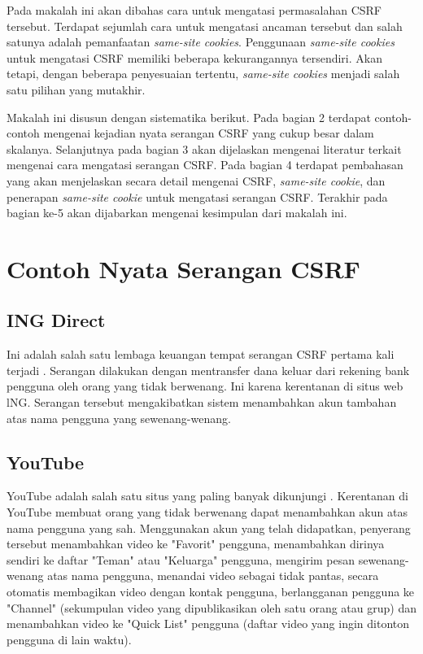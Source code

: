 \documentclass{article}
\begin{document}
Pada makalah ini akan dibahas cara untuk mengatasi permasalahan CSRF tersebut. Terdapat sejumlah cara untuk mengatasi ancaman tersebut dan salah satunya adalah pemanfaatan \textit{same-site cookies}. Penggunaan \textit{same-site cookies} untuk mengatasi CSRF memiliki beberapa kekurangannya tersendiri. Akan tetapi, dengan beberapa penyesuaian tertentu, \textit{same-site cookies} menjadi salah satu pilihan yang mutakhir.

Makalah ini disusun dengan sistematika berikut. Pada bagian 2 terdapat contoh-contoh mengenai kejadian nyata serangan CSRF yang cukup besar dalam skalanya. Selanjutnya pada bagian 3 akan dijelaskan mengenai literatur terkait mengenai cara mengatasi serangan CSRF. Pada bagian 4 terdapat pembahasan yang akan menjelaskan secara detail mengenai CSRF, \textit{same-site cookie}, dan penerapan \textit{same-site cookie} untuk mengatasi serangan CSRF. Terakhir pada bagian ke-5 akan dijabarkan mengenai kesimpulan dari makalah ini.

\section{Contoh Nyata Serangan CSRF}
\subsection{ING Direct}
Ini adalah salah satu lembaga keuangan tempat serangan CSRF pertama kali terjadi \cite{zeller2008cross}. Serangan dilakukan dengan mentransfer dana keluar dari rekening bank pengguna oleh orang yang tidak berwenang. Ini karena kerentanan di situs web lNG. Serangan tersebut mengakibatkan sistem menambahkan akun tambahan atas nama pengguna yang sewenang-wenang.

\subsection{YouTube}
YouTube adalah salah satu situs yang paling banyak dikunjungi \cite{zeller2008cross}. Kerentanan di YouTube membuat orang yang tidak berwenang dapat menambahkan akun atas nama pengguna yang sah. Menggunakan akun yang telah didapatkan, penyerang tersebut menambahkan video ke "Favorit" pengguna, menambahkan dirinya sendiri ke daftar "Teman" atau "Keluarga" pengguna, mengirim pesan sewenang-wenang atas nama pengguna, menandai video sebagai tidak pantas, secara otomatis membagikan video dengan kontak pengguna, berlangganan pengguna ke "Channel" (sekumpulan video yang dipublikasikan oleh satu orang atau grup) dan menambahkan video ke "Quick List" pengguna (daftar video yang ingin ditonton pengguna di lain waktu).
\end{document}
